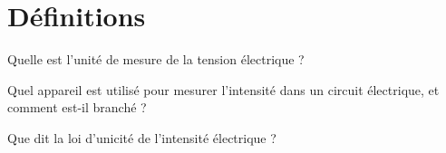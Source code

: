 \section{Définitions}


\begin{questions}
	\question Quelle est l'unité de mesure de la tension électrique ?
	\fillwithdottedlines{1cm}
	
	\question Quel appareil est utilisé pour mesurer l'intensité dans un circuit électrique, et comment est-il branché ?
	\fillwithdottedlines{1.5cm}

	\question Que dit la loi d'unicité de l'intensité électrique ?	
	\fillwithdottedlines{2cm}
	
	
\end{questions}
